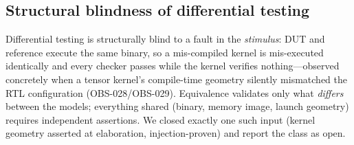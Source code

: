 \documentclass[conference]{IEEEtran}
\begin{document}
\subsection{Structural blindness of differential testing}
Differential testing is structurally blind to a fault in the
\emph{stimulus}: DUT and reference execute the same binary, so a
mis-compiled kernel is mis-executed identically and every checker
passes while the kernel verifies nothing---observed concretely when a
tensor kernel's compile-time geometry silently mismatched the RTL
configuration (OBS-028/OBS-029). Equivalence validates only what
\emph{differs} between the models; everything shared (binary, memory
image, launch geometry) requires independent assertions. We closed
exactly one such input (kernel geometry asserted at elaboration,
injection-proven) and report the class as open.
\end{document}
